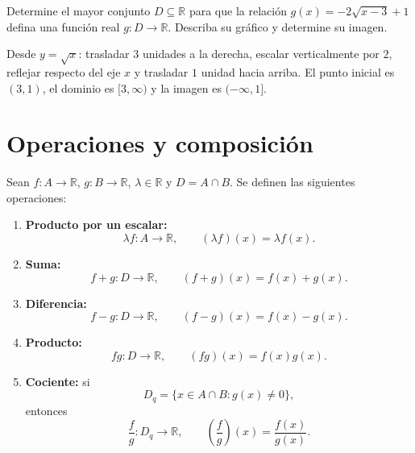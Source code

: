 \begin{ejemplo}[transformaciones]
Determine el mayor conjunto $D\subseteq\mathbb{R}$ para que la relación $g(x)=-2\sqrt{x-3}+1$ defina una función real $g:D\to\mathbb{R}$. Describa su gráfico y determine su imagen.
\end{ejemplo}
\ifmostrarSoluciones
\begin{solucion}
Desde $y=\sqrt{x}$: trasladar $3$ unidades a la derecha, escalar verticalmente por $2$, reflejar respecto del eje $x$ y trasladar $1$ unidad hacia arriba. El punto inicial es $(3,1)$, el dominio es $[3,\infty)$ y la imagen es $(-\infty,1]$.
\begin{center}
\end{center}
\end{solucion}
\else\vspace{15mm}\fi

\section*{Operaciones y composición}

\begin{definicion}[operaciones]
Sean $f:A\to\mathbb{R}$, $g:B\to\mathbb{R}$, $\lambda\in\mathbb{R}$ y $D=A\cap B$. Se definen las siguientes operaciones:
\begin{enumerate}
  \item \textbf{Producto por un escalar:}
  \[
  \lambda f:A\to\mathbb{R},\qquad
  (\lambda f)(x)=\lambda f(x).
  \]
  \item \textbf{Suma:}
  \[
  f+g:D\to\mathbb{R},\qquad
  (f+g)(x)=f(x)+g(x).
  \]
  \item \textbf{Diferencia:}
  \[
  f-g:D\to\mathbb{R},\qquad
  (f-g)(x)=f(x)-g(x).
  \]
  \item \textbf{Producto:}
  \[
  fg:D\to\mathbb{R},\qquad
  (fg)(x)=f(x)g(x).
  \]
  \item \textbf{Cociente:} si
  \[
  D_q=\{x\in A\cap B:g(x)\neq0\},
  \]
  entonces
  \[
  \frac{f}{g}:D_q\to\mathbb{R},\qquad
  \left(\frac fg\right)(x)=\frac{f(x)}{g(x)}.
  \]
\end{enumerate}
\end{definicion}

